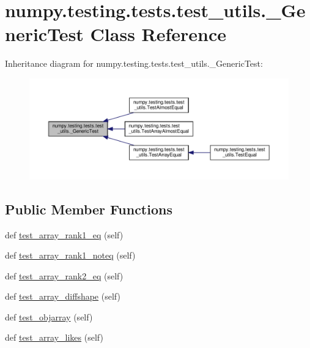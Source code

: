 \hypertarget{classnumpy_1_1testing_1_1tests_1_1test__utils_1_1__GenericTest}{}\section{numpy.\+testing.\+tests.\+test\+\_\+utils.\+\_\+\+Generic\+Test Class Reference}
\label{classnumpy_1_1testing_1_1tests_1_1test__utils_1_1__GenericTest}


Inheritance diagram for numpy.\+testing.\+tests.\+test\+\_\+utils.\+\_\+\+Generic\+Test\+:
\nopagebreak
\begin{figure}[H]
\begin{center}
\leavevmode
\includegraphics[width=350pt]{classnumpy_1_1testing_1_1tests_1_1test__utils_1_1__GenericTest__inherit__graph}
\end{center}
\end{figure}
\subsection*{Public Member Functions}
\begin{DoxyCompactItemize}
\item 
def \hyperlink{classnumpy_1_1testing_1_1tests_1_1test__utils_1_1__GenericTest_a97183fd6e41d932a60c218615a224683}{test\+\_\+array\+\_\+rank1\+\_\+eq} (self)
\item 
def \hyperlink{classnumpy_1_1testing_1_1tests_1_1test__utils_1_1__GenericTest_af60c25d552bb179dde5d45d20e76d584}{test\+\_\+array\+\_\+rank1\+\_\+noteq} (self)
\item 
def \hyperlink{classnumpy_1_1testing_1_1tests_1_1test__utils_1_1__GenericTest_aab5668985eadf2d4251e73331f670331}{test\+\_\+array\+\_\+rank2\+\_\+eq} (self)
\item 
def \hyperlink{classnumpy_1_1testing_1_1tests_1_1test__utils_1_1__GenericTest_a0e27d0e2513125361fa6acf6c6d3c8c5}{test\+\_\+array\+\_\+diffshape} (self)
\item 
def \hyperlink{classnumpy_1_1testing_1_1tests_1_1test__utils_1_1__GenericTest_a39ff1438013c7ed56363e911177648d8}{test\+\_\+objarray} (self)
\item 
def \hyperlink{classnumpy_1_1testing_1_1tests_1_1test__utils_1_1__GenericTest_a57ab6334991342fa414658e080a14baf}{test\+\_\+array\+\_\+likes} (self)
\end{DoxyCompactItemize}


